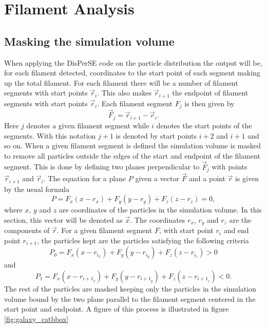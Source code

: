 \section{Filament Analysis}
\subsection{Masking the simulation volume}\label{sec:maskingfilament}
When applying the DisPerSE code on the particle distribution the output will be,
for each filament detected, coordinates to the start point of each segment
making up the total filament. For each filament there will be a number of
filament segments with start points $\vec{r}_i$. This also makes $\vec{r}_{i+1}$
the endpoint of filament segments with start points $\vec{r}_i$. Each filament segment $F_j$ is
then given by
\begin{equation}
    \vec{F}_{j}=\vec{r}_{i+1}-\vec{r}_i.
\end{equation}
Here $j$ denotes a given filament segment while $i$ denotes the start points of the
segments. With this notation $j+1$ is denoted by start points $i+2$ and $i+1$ and
so on. When a given filament segment is defined the simulation volume is masked
to remove all particles outside the edges of the start and endpoint of the
filament segment. This is done by defining  two planes perpendicular to
$\vec{F}_j$ with points $\vec{r}_{i+1}$ and $\vec{r}_i$. The equation for a
plane $P$ given a vector $\vec{F}$ and a point $\vec{r}$ is given
by the usual formula
\begin{equation}\label{eq:plane_mask}
    P=F_x(x-r_x)+F_y(y-r_y)+F_z(z-r_z)=0,
\end{equation}
where $x$, $y$ and $z$ are coordinates of the particles in the simulation
volume. In this section, this vector will be denoted as $\vec{x}$.
The coordinates $r_x$, $r_y$ and $r_z$ are the components of $\vec{r}$.
For a given filament segment $F$, with start point $r_{i}$ and end point $r_{i+1}$, the particles kept are the particles
satisfying the following criteria
\begin{equation}
    P_0=F_x(x-r_{i_x})+F_y(y-r_{i_y})+F_z(z-r_{i_z})>0
\end{equation}
and
\begin{equation}
    P_1=F_x(x-r_{{i+1}_x})+F_y(y-r_{{i+1}_y})+F_z(z-r_{{i+1}_z})<0.
\end{equation}
The rest of the particles are masked keeping only the particles in the
simulation volume bound by the two plane parallel to the filament segment
centered in the start point and endpoint. A figure of this process is illustrated in figure \ref{fig:galaxy_catbbox}
